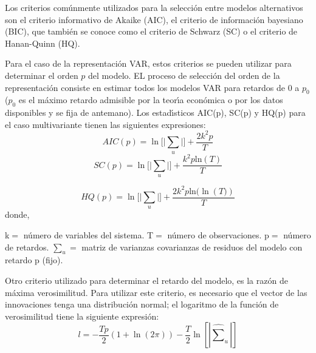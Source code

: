 Los criterios com\'{u}nmente utilizados para la selecci\'{o}n entre modelos alternativos son el criterio informativo de Akaike (AIC), el criterio de informaci\'{o}n bayesiano (BIC), que tambi\'{e}n se conoce como el criterio de Schwarz (SC) o el criterio de Hanan-Quinn (HQ).\newline

Para el caso de la representaci\'{o}n VAR, estos criterios se pueden utilizar para determinar el orden $p$ del modelo. EL proceso de selecci\'{o}n del orden de la representaci\'{o}n consiste en estimar todos los modelos VAR para retardos de 0 a $p_{0}$ ($p_{0}$ es el m\'{a}ximo retardo admisible por la teor\'{\i}a econ\'{o}mica o por los datos disponibles y se fija de 
antemano). Los estad\'{\i}sticos AIC(p), SC(p) y HQ(p) para el caso multivariante tienen las siguientes expresiones:
\[
AIC\left( p \right)=\ln \Big[ \big| \sum_{u} \big| \Big]+
\frac{2k^{2}p}{T}
\]
\[
SC\left( p \right)=\ln \Big[ \big| \sum_{u} \big| \Big]+
\frac{k^{2}p\mathrm{ln}(T)}{T}
\]

\[
HQ\left( p \right)=\ln \Big[ \big| \sum_{u} \big| \Big]+\frac{2k^{2}p\mathrm{ln}(\ln \left( T) \right)}{T}
\]
donde,\newline

k$=$ n\'{u}mero de variables del sistema.\newline
T$=$ n\'{u}mero de observaciones.\newline
p$=$ n\'{u}mero de retardos.\newline
$\sum_{u}=$ matriz de varianzas covarianzas de residuos del modelo con retardo p (fijo).\newline

Otro criterio utilizado para determinar el retardo del modelo, es la raz\'{o}n de m\'{a}xima verosimilitud. Para utilizar este criterio, es necesario que el vector de las innovaciones tenga una distribuci\'{o}n normal; el logaritmo de la funci\'{o}n de verosimilitud tiene la siguiente expresi\'{o}n: 
\[
l=-\frac{Tp}{2}\left( 1+\ln \left( 2\pi \right) \right)-\frac{T}{2}\ln \left[ \left| \hat{\sum }_{u} \right| \right]
\]

